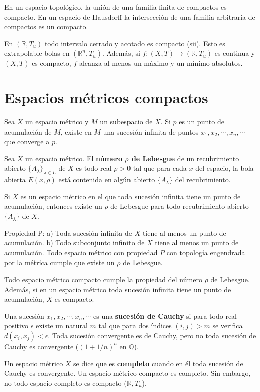 \documentclass[a4paper, 11pt]{extarticle}
\begin{document}
En un espacio topológico, la unión de una familia finita de compactos es
compacto. En un espacio de Hausdorff la intersección de una familia arbitraria
de compactos es un compacto.

En \(( \mathbb{R}, T_u)\) todo intervalo cerrado y acotado es compacto (sii).
Esto es extrapolable  bolas en \((\mathbb{R}^n, T_u)\). Además, si \(f:(X,T)
\rightarrow (\mathbb{R}, T_u)\) es continua y \((X,T)\) es compacto, \(f\)
alcanza al menos un máximo y un mínimo absolutos.

\section{Espacios métricos compactos}
\label{sec:org0da3bc1}
Sea \(X\) un espacio métrico y \(M\) un subespacio de \(X\). Si \(p\)
es un punto de acumulación de \(M\), existe en \(M\) una sucesión infinita
de puntos \(x_1, x_2, \cdots, x_n, \cdots\) que converge a \(p\).

Sea \(X\) un espacio métrico. El \textbf{número \(\rho\) de Lebesgue} de un
recubrimiento abierto \(\{ A_\lambda \}_{\lambda \in L}\) de \(X\) es todo
real \(\rho > 0\) tal que para cada \(x\) del espacio, la bola abierta \(E(x,\rho)\) está contenida en algún abierto \(\{ A_\lambda \}\) del
recubrimiento. 

Si \(X\) es un espacio métrico en el que toda sucesión infinita tiene un punto
de acumulación, entonces existe un \(\rho\) de Lebesgue para todo
recubrimiento abierto \(\{ A_\lambda \}\) de \(X\). 

Propiedad P: a) Toda sucesión infinita de \(X\) tiene al menos un punto de
acumulación. b) Todo subconjunto infinito de \(X\) tiene al menos un punto de
acumulación. Todo espacio métrico con propiedad \(P\) con topología engendrada
por la métrica cumple  que existe un \(\rho\) de Lebesgue. 

Todo espacio métrico compacto cumple la propiedad del número \(\rho\) de
Lebesgue. Además, si en un espacio métrico toda sucesión infinita tiene un punto
de acumulación, \(X\) es compacto.

Una sucesión \(x_1, x_2, \cdots, x_n, \cdots\) es una \textbf{sucesión de Cauchy} si
para todo real positivo \(\epsilon\) existe un natural \(m\) tal que para
dos índices \((i,j) > m\) se verifica \(d(x_i, x_j) < \epsilon\). Toda
sucesión convergente es de Cauchy, pero no toda sucesión de Cauchy es
convergente (\((1 + 1/n)^n\) en \(\mathbb{Q}\)).

Un espacio métrico \(X\) se dice que es \textbf{completo} cuando en él toda sucesión de
Cauchy es convergente. Un espacio métrico compacto es completo. Sin embargo, no
todo espacio completo es compacto (\(\mathbb{R}, T_u\)).
\end{document}
